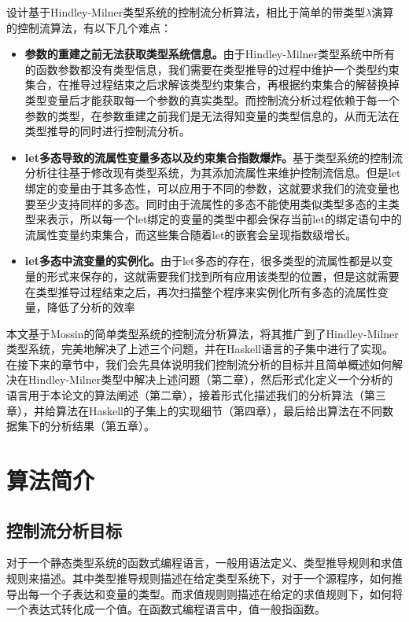 \documentclass[UTF8, colorlinks]{pkuthss}
\begin{document}
	设计基于Hindley-Milner类型系统的控制流分析算法，相比于简单的带类型$\lambda$演算的控制流算法，有以下几个难点：
	\begin{itemize}
		\item \textbf{参数的重建之前无法获取类型系统信息。}由于Hindley-Milner类型系统中所有的函数参数都没有类型信息，我们需要在类型推导的过程中维护一个类型约束集合，在推导过程结束之后求解该类型约束集合，再根据约束集合的解替换掉类型变量后才能获取每一个参数的真实类型。而控制流分析过程依赖于每一个参数的类型，在参数重建之前我们是无法得知变量的类型信息的，从而无法在类型推导的同时进行控制流分析。
		\item \textbf{let多态导致的流属性变量多态以及约束集合指数爆炸。}基于类型系统的控制流分析往往基于修改现有类型系统，为其添加流属性来维护控制流信息。但是let绑定的变量由于其多态性，可以应用于不同的参数，这就要求我们的流变量也要至少支持同样的多态。同时由于流属性的多态不能使用类似类型多态的主类型来表示，所以每一个let绑定的变量的类型中都会保存当前let的绑定语句中的流属性变量约束集合，而这些集合随着let的嵌套会呈现指数级增长。
		\item \textbf{let多态中流变量的实例化。}由于let多态的存在，很多类型的流属性都是以变量的形式来保存的，这就需要我们找到所有应用该类型的位置，但是这就需要在类型推导过程结束之后，再次扫描整个程序来实例化所有多态的流属性变量，降低了分析的效率
	\end{itemize}
	
	本文基于Mossin的简单类型系统的控制流分析算法，将其推广到了Hindley-Milner类型系统，完美地解决了上述三个问题，并在Haskell语言的子集中进行了实现。 在接下来的章节中，我们会先具体说明我们控制流分析的目标并且简单概述如何解决在Hindley-Milner类型中解决上述问题（第二章），然后形式化定义一个分析的语言用于本论文的算法阐述（第二章），接着形式化描述我们的分析算法（第三章），并给算法在Haskell的子集上的实现细节（第四章），最后给出算法在不同数据集下的分析结果（第五章）。

	
	\chapter{算法简介}
	\section{控制流分析目标}
	对于一个静态类型系统的函数式编程语言，一般用语法定义、类型推导规则和求值规则来描述。其中类型推导规则描述在给定类型系统下，对于一个源程序，如何推导出每一个子表达和变量的类型。而求值规则则描述在给定的求值规则下，如何将一个表达式转化成一个值。在函数式编程语言中，值一般指函数。
	
\end{document}
